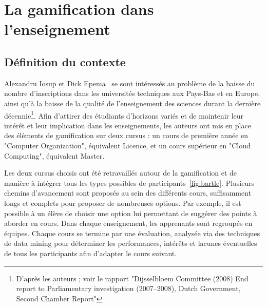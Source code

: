 \section{La gamification dans l'enseignement}
\subsection{Définition du contexte}
Alexandru Iosup et Dick Epema~\cite{gamif-educ} se sont intéressés au problème de la baisse du nombre d'inscriptions dans les universités techniques aux Pays-Bas et en Europe, ainsi qu'à la baisse de la qualité de l'enseignement des sciences durant la dernière décennie\footnote{D'après les auteurs ; voir le rapport "Dijsselbloem Committee (2008) End report to Parliamentary
investigation (2007–2008), Dutch Government, Second
Chamber Report"}. Afin d'attirer des étudiants d'horizons variés et de maintenir leur intérêt et leur implication dans les enseignements, les auteurs ont mis en place des éléments de gamification sur deux cursus : un cours de première année en "Computer Organization", équivalent Licence, et un cours supérieur en "Cloud Computing", équivalent Master. \par

Les deux cursus choisis ont été retravaillés autour de la gamification et de manière à intégrer tous les types possibles de participants~\ref{fig:bartle}. Plusieurs chemins d'avancement sont proposés au sein des différents cours, suffisamment longs et complets pour proposer de nombreuses options. Par exemple, il est possible à un élève de choisir une option lui permettant de suggérer des points à aborder en cours. Dans chaque enseignement, les apprenants sont regroupés en équipes. Chaque cours se termine par une évaluation, analysée via des techniques de data mining pour déterminer les performances, intérêts et lacunes éventuelles de tous les participants afin d'adapter le cours suivant.

